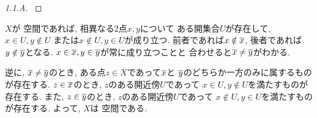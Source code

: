 \documentclass[uplatex, dvipdfmx, a4paper, 12pt, class=jsarticle, crop=false]{standalone}
\begin{document}
\begin{proof}[1.1.A]\label{eng-1-5-A-proof}

\end{proof}

	\(X\)が  空間であれば, 相異なる2点\(x, y\)について
	ある開集合\(U\)が存在して, \(x \in U, y \notin U\)
	または\(x \notin U, y \in U\)が成り立つ.
	前者であれば\(x \notin \overline{x}\),
	後者であれば\(y \notin \overline{y}\)となる.
	\(x \in \overline{x}, y \in \overline{y}\)が常に成り立つことと
	合わせると\(\overline{x} \neq \overline{y}\)がわかる.

	逆に, \(\overline{x} \neq \overline{y}\)のとき,
	ある点\(z \in X\)であって\(\overline{x}\)と
	\(\overline{y}\)のどちらか一方のみに属するものが存在する.
	\(z \in \overline{x}\)のとき, \(z\)のある開近傍\(U\)であって
	\(x \in U, y \notin U\)を満たすものが存在する.
	また, \(z \in \overline{y}\)のとき, \(z\)のある開近傍\(U\)であって
	\(x \notin U, y \in U\)を満たすものが存在する.
	よって, \(X\)は  空間である.
\end{document}
